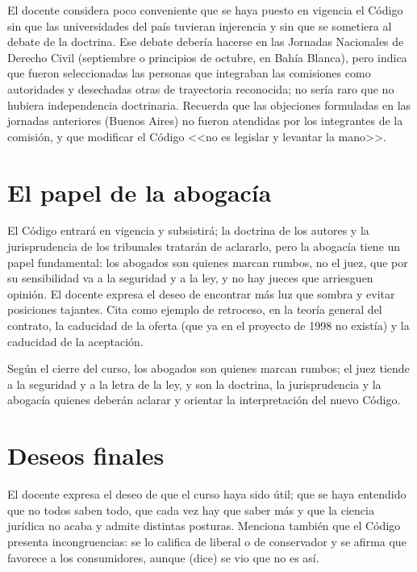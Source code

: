 \documentclass[12pt,oneside]{book}
\begin{document}
El docente considera poco conveniente que se haya puesto en vigencia el C\'odigo sin que las universidades del pa\'is tuvieran injerencia y sin que se sometiera al debate de la doctrina. Ese debate deber\'ia hacerse en las Jornadas Nacionales de Derecho Civil (septiembre o principios de octubre, en Bah\'ia Blanca), pero indica que fueron seleccionadas las personas que integraban las comisiones como autoridades y desechadas otras de trayectoria reconocida; no ser\'ia raro que no hubiera independencia doctrinaria. Recuerda que las objeciones formuladas en las jornadas anteriores (Buenos Aires) no fueron atendidas por los integrantes de la comisi\'on, y que modificar el C\'odigo <<no es legislar y levantar la mano>>.


\section{El papel de la abogac\'ia}

El C\'odigo entrar\'a en vigencia y subsistir\'a; la doctrina de los autores y la jurisprudencia de los tribunales tratar\'an de aclararlo, pero la abogac\'ia tiene un papel fundamental: los abogados son quienes marcan rumbos, no el juez, que por su sensibilidad va a la seguridad y a la ley, y no hay jueces que arriesguen opini\'on. El docente expresa el deseo de encontrar m\'as luz que sombra y evitar posiciones tajantes. Cita como ejemplo de retroceso, en la teor\'ia general del contrato, la caducidad de la oferta (que ya en el proyecto de 1998 no exist\'ia) y la caducidad de la aceptaci\'on.

\begin{important}
Seg\'un el cierre del curso, los abogados son quienes marcan rumbos; el juez tiende a la seguridad y a la letra de la ley, y son la doctrina, la jurisprudencia y la abogac\'ia quienes deber\'an aclarar y orientar la interpretaci\'on del nuevo C\'odigo.
\end{important}

\section{Deseos finales}

El docente expresa el deseo de que el curso haya sido \'util; que se haya entendido que no todos saben todo, que cada vez hay que saber m\'as y que la ciencia jur\'idica no acaba y admite distintas posturas. Menciona tambi\'en que el C\'odigo presenta incongruencias: se lo califica de liberal o de conservador y se afirma que favorece a los consumidores, aunque (dice) se vio que no es as\'i.
\end{document}
